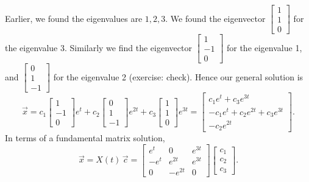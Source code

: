 \documentclass{ximera}
\begin{document}
\begin{exampleSol}
    Earlier, we found the eigenvalues are $1,2,3$.  We found the eigenvector $\left[ \begin{smallmatrix} 1 \\ 1 \\ 0 \end{smallmatrix} \right]$ for the eigenvalue 3.  Similarly we find the eigenvector  $\left[ \begin{smallmatrix} 1 \\ -1 \\ 0 \end{smallmatrix} \right]$ for the eigenvalue 1, and  $\left[ \begin{smallmatrix} 0 \\ 1 \\ -1 \end{smallmatrix} \right]$ for the eigenvalue 2 (exercise: check). Hence our general solution is
    \begin{equation*}
        \vec{x} = c_1
        \begin{bmatrix}
            1 \\ 
            -1 \\ 
            0
        \end{bmatrix}
        e^t + c_2
        \begin{bmatrix}
            0 \\ 
            1 \\ 
            -1
        \end{bmatrix}
        e^{2t} + c_3
        \begin{bmatrix}
            1 \\ 
            1 \\ 
            0
        \end{bmatrix}
        e^{3t} =
        \begin{bmatrix}
            c_1 e^t+c_3 e^{3t} \\ 
            -c_1 e^t + c_2 e^{2t} + c_3 e^{3t} \\ 
            - c_2 e^{2t}
        \end{bmatrix} .
    \end{equation*}
    In terms of a fundamental matrix solution,
    \begin{equation*}
        \vec{x} = X(t)\, \vec{c} =
        \begin{bmatrix}
            e^t & 0 & e^{3t} \\
            -e^t & e^{2t} & e^{3t} \\
            0 & -e^{2t} & 0
        \end{bmatrix}
        \begin{bmatrix}
            c_1 \\ 
            c_2 \\ 
            c_3
        \end{bmatrix} .
    \end{equation*}
\end{exampleSol}
\end{document}
